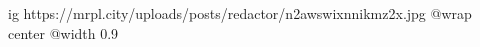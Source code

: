  
 
 
 
 

\ifcmt
  ig https://mrpl.city/uploads/posts/redactor/n2awswixnnikmz2x.jpg
  @wrap center
  @width 0.9
\fi
